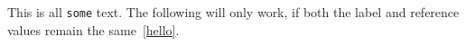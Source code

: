 This is all \texttt{some} text.\label{hello}
The following will only work, if both the label and reference values remain the same~\ref{hello}.